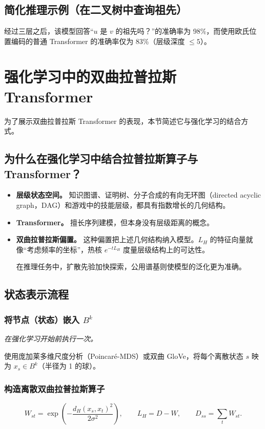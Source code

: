 \subsection{简化推理示例（在二叉树中查询祖先）}
经过三层之后，该模型回答“$u$ 是 $v$ 的祖先吗？”的准确率为 98\%，而使用欧氏位置编码的普通 Transformer 的准确率仅为 83\%（层级深度 $\leq5$）。

\section{强化学习中的双曲拉普拉斯 Transformer}
\label{sec:3.14}
为了展示双曲拉普拉斯 Transformer 的表现，本节简述它与强化学习的结合方式。

\subsection{为什么在强化学习中结合拉普拉斯算子与 Transformer？}
\begin{itemize}
\item \textbf{层级状态空间。} 知识图谱、证明树、分子合成的有向无环图（directed acyclic graph，DAG）和游戏中的技能层级，都具有指数增长的几何结构。
\item \textbf{Transformer。} 擅长序列建模，但本身没有层级距离的概念。
\item \textbf{双曲拉普拉斯偏置。} 这种偏置把上述几何结构纳入模型。$L_H$ 的特征向量就像“考虑频率的坐标”，热核 $e^{-tL_H}$ 度量层级结构上的可达性。

在推理任务中，扩散先验加快探索，公用谱基则使模型的泛化更为准确。
\end{itemize}

\subsection{状态表示流程}
\subsubsection{将节点（状态）嵌入 \texorpdfstring{$B^k$}{Bᵏ}}
\emph{在强化学习开始前执行一次。}

使用庞加莱多维尺度分析（Poincaré-MDS）或双曲 GloVe，将每个离散状态 $s$ 映为 $x_s\in B^k$（半径为 1 的球）。

\subsubsection{构造离散双曲拉普拉斯算子}
\[
  W_{st}=\exp\!\left(-\frac{d_H(x_s,x_t)^2}{2\sigma^2}\right),\qquad
  L_H=D-W,\qquad D_{ss}=\sum_tW_{st}.
\]

